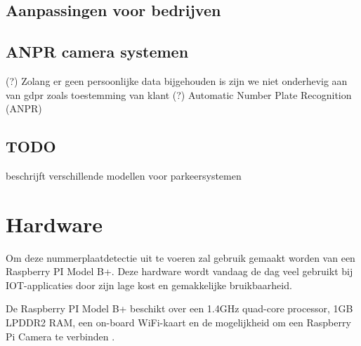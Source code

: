 \subsection{Aanpassingen voor bedrijven}

\subsection{ANPR camera systemen}
\label{anpr-cameras}

(?) Zolang er geen persoonlijke data bijgehouden is zijn we niet onderhevig aan van gdpr zoals toestemming van klant (?)
Automatic Number Plate Recognition (ANPR)

\subsection{TODO}
\textcite{sharma2017automated} beschrijft verschillende modellen voor parkeersystemen

\section{Hardware}
Om deze nummerplaatdetectie uit te voeren zal gebruik gemaakt worden van een Raspberry PI Model B+. Deze hardware wordt vandaag de dag veel gebruikt bij IOT-applicaties door zijn lage kost en gemakkelijke bruikbaarheid.  

De Raspberry PI Model B+ beschikt over een 1.4GHz quad-core processor, 1GB LPDDR2 RAM, een on-board WiFi-kaart en de mogelijkheid om een Raspberry Pi Camera te verbinden \autocite{raspberrypisite} .